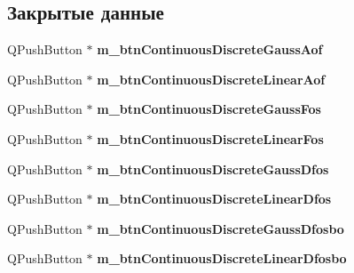 \subsection*{Закрытые данные}
\begin{DoxyCompactItemize}
\item 
\hypertarget{class_filter_start_buttons_box_a230951226cd8d50671fed030a7b0f615}{}\label{class_filter_start_buttons_box_a230951226cd8d50671fed030a7b0f615} 
Q\+Push\+Button $\ast$ {\bfseries m\+\_\+btn\+Continuous\+Discrete\+Gauss\+Aof}
\item 
\hypertarget{class_filter_start_buttons_box_ad700eeed912667c328ac4e6ea37a6e1e}{}\label{class_filter_start_buttons_box_ad700eeed912667c328ac4e6ea37a6e1e} 
Q\+Push\+Button $\ast$ {\bfseries m\+\_\+btn\+Continuous\+Discrete\+Linear\+Aof}
\item 
\hypertarget{class_filter_start_buttons_box_ab2caca5b2a08d8c4f3b48198d4f9091a}{}\label{class_filter_start_buttons_box_ab2caca5b2a08d8c4f3b48198d4f9091a} 
Q\+Push\+Button $\ast$ {\bfseries m\+\_\+btn\+Continuous\+Discrete\+Gauss\+Fos}
\item 
\hypertarget{class_filter_start_buttons_box_aa26b0be9c1fb9ab3f82674e8698b3125}{}\label{class_filter_start_buttons_box_aa26b0be9c1fb9ab3f82674e8698b3125} 
Q\+Push\+Button $\ast$ {\bfseries m\+\_\+btn\+Continuous\+Discrete\+Linear\+Fos}
\item 
\hypertarget{class_filter_start_buttons_box_aa373a92abd69a3ef2530ee14d8057262}{}\label{class_filter_start_buttons_box_aa373a92abd69a3ef2530ee14d8057262} 
Q\+Push\+Button $\ast$ {\bfseries m\+\_\+btn\+Continuous\+Discrete\+Gauss\+Dfos}
\item 
\hypertarget{class_filter_start_buttons_box_a12376691543adacbdcb9bf931e48cf75}{}\label{class_filter_start_buttons_box_a12376691543adacbdcb9bf931e48cf75} 
Q\+Push\+Button $\ast$ {\bfseries m\+\_\+btn\+Continuous\+Discrete\+Linear\+Dfos}
\item 
\hypertarget{class_filter_start_buttons_box_af93590d952a8dbe78c6a6f21087d1f2c}{}\label{class_filter_start_buttons_box_af93590d952a8dbe78c6a6f21087d1f2c} 
Q\+Push\+Button $\ast$ {\bfseries m\+\_\+btn\+Continuous\+Discrete\+Gauss\+Dfosbo}
\item 
\hypertarget{class_filter_start_buttons_box_a8edc659f1d9992cd61fe6b3cef7740c3}{}\label{class_filter_start_buttons_box_a8edc659f1d9992cd61fe6b3cef7740c3} 
Q\+Push\+Button $\ast$ {\bfseries m\+\_\+btn\+Continuous\+Discrete\+Linear\+Dfosbo}
\item 
\hypertarget{class_filter_start_buttons_box_a5c75687effdf4ff8b974c34125d01795}{}\label{class_filter_start_buttons_box_a5c75687effdf4ff8b974c34125d01795} 

\end{DoxyCompactItemize}
